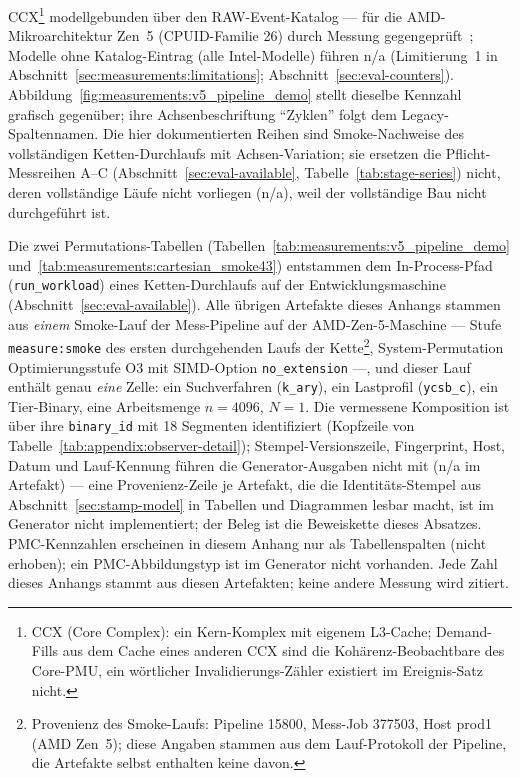 CCX\footnote{CCX (Core Complex): ein Kern-Komplex mit eigenem L3-Cache; Demand-Fills aus dem Cache
eines anderen CCX sind die Kohärenz-Beobachtbare des Core-PMU, ein wörtlicher Invalidierungs-Zähler
existiert im Ereignis-Satz nicht.} modellgebunden über den RAW-Event-Katalog --- für die
AMD-Mikroarchitektur Zen~5 (CPUID-Familie 26) durch Messung
gegengeprüft~\cite{linux_perf_amdzen5,weaver2008counters}; Modelle ohne Katalog-Eintrag (alle
Intel-Modelle) führen n/a (Limitierung~1 in Abschnitt~\ref{sec:measurements:limitations};
Abschnitt~\ref{sec:eval-counters}). Abbildung~\ref{fig:measurements:v5_pipeline_demo} stellt
dieselbe Kennzahl grafisch gegenüber; ihre Achsenbeschriftung \enquote{Zyklen} folgt dem
Legacy-Spaltennamen. Die hier dokumentierten Reihen sind Smoke-Nachweise des vollständigen
Ketten-Durchlaufs mit Achsen-Variation; sie ersetzen die Pflicht-Messreihen A--C
(Abschnitt~\ref{sec:eval-available}, Tabelle~\ref{tab:stage-series}) nicht, deren vollständige Läufe
nicht vorliegen (n/a), weil der vollständige Bau nicht durchgeführt ist.

Die zwei Permutations-Tabellen (Tabellen~\ref{tab:measurements:v5_pipeline_demo}
und~\ref{tab:measurements:cartesian_smoke43}) entstammen dem In-Process-Pfad
(\texttt{run\_workload}) eines Ketten-Durchlaufs auf der Entwicklungsmaschine
(Abschnitt~\ref{sec:eval-available}). Alle übrigen Artefakte dieses Anhangs stammen aus \emph{einem}
Smoke-Lauf der Mess-Pipeline auf der AMD-Zen-5-Maschine --- Stufe \texttt{measure:smoke} des ersten
durchgehenden Laufs der Kette\footnote{Provenienz des Smoke-Laufs: Pipeline 15800, Mess-Job 377503, Host
prod1 (AMD Zen~5); diese Angaben stammen aus dem Lauf-Protokoll der Pipeline, die Artefakte selbst
enthalten keine davon.}, System-Permutation Optimierungsstufe O3 mit SIMD-Option
\texttt{no\_extension} ---, und dieser Lauf enthält genau \emph{eine} Zelle: ein Suchverfahren
(\texttt{k\_ary}), ein Lastprofil (\texttt{ycsb\_c}), ein Tier-Binary, eine Arbeitsmenge $n = 4096$,
$N = 1$. Die vermessene Komposition ist über ihre \texttt{binary\_id} mit 18 Segmenten identifiziert
(Kopfzeile von Tabelle~\ref{tab:appendix:observer-detail}); Stempel-Versionszeile, Fingerprint, Host,
Datum und Lauf-Kennung führen die Generator-Ausgaben nicht mit (n/a im Artefakt) --- eine
Provenienz-Zeile je Artefakt, die die Identitäts-Stempel aus Abschnitt~\ref{sec:stamp-model} in
Tabellen und Diagrammen lesbar macht, ist im Generator nicht implementiert; der Beleg ist die Beweiskette
dieses Absatzes. PMC-Kennzahlen erscheinen in diesem Anhang nur als Tabellenspalten (nicht
erhoben); ein PMC-Abbildungstyp ist im Generator nicht vorhanden. Jede Zahl dieses Anhangs stammt aus
diesen Artefakten; keine andere Messung wird zitiert.

